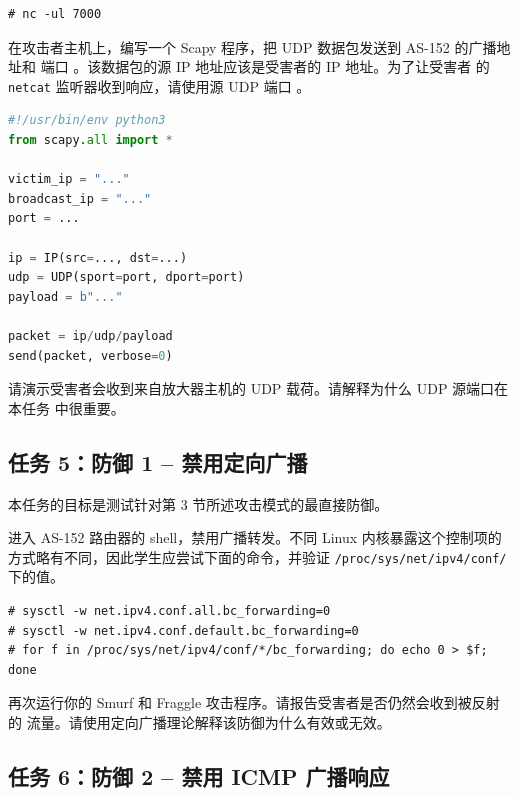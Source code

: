 \begin{lstlisting}
# nc -ul 7000
\end{lstlisting}

在攻击者主机上，编写一个 Scapy 程序，把 UDP 数据包发送到 AS-152 的广播地址和
端口 \fraggleport。该数据包的源 IP 地址应该是受害者的 IP 地址。为了让受害者
的 \texttt{netcat} 监听器收到响应，请使用源 UDP 端口 \fraggleport。

\begin{lstlisting}[language=python]
#!/usr/bin/env python3
from scapy.all import *

victim_ip = "..."
broadcast_ip = "..."
port = ...

ip = IP(src=..., dst=...)
udp = UDP(sport=port, dport=port)
payload = b"..."

packet = ip/udp/payload
send(packet, verbose=0)
\end{lstlisting}

请演示受害者会收到来自放大器主机的 UDP 载荷。请解释为什么 UDP 源端口在本任务
中很重要。



\subsection{任务 5：防御 1 -- 禁用定向广播}

本任务的目标是测试针对第 3 节所述攻击模式的最直接防御。

进入 AS-152 路由器的 shell，禁用广播转发。不同 Linux 内核暴露这个控制项的
方式略有不同，因此学生应尝试下面的命令，并验证
\texttt{/proc/sys/net/ipv4/conf/} 下的值。

\begin{lstlisting}
# sysctl -w net.ipv4.conf.all.bc_forwarding=0
# sysctl -w net.ipv4.conf.default.bc_forwarding=0
# for f in /proc/sys/net/ipv4/conf/*/bc_forwarding; do echo 0 > $f; done
\end{lstlisting}

再次运行你的 Smurf 和 Fraggle 攻击程序。请报告受害者是否仍然会收到被反射的
流量。请使用定向广播理论解释该防御为什么有效或无效。


\subsection{任务 6：防御 2 -- 禁用 ICMP 广播响应}

